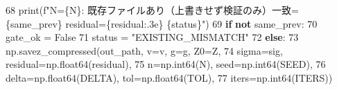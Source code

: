 \documentclass[
  a4paper,
]{ltjsarticle}
\newenvironment{Shaded}{}{}
\newcommand{\BuiltInTok}[1]{\textcolor[rgb]{0.00,0.50,0.00}{#1}}
\newcommand{\ControlFlowTok}[1]{\textcolor[rgb]{0.00,0.44,0.13}{\textbf{#1}}}
\newcommand{\DecValTok}[1]{\textcolor[rgb]{0.25,0.63,0.44}{#1}}
\newcommand{\KeywordTok}[1]{\textcolor[rgb]{0.00,0.44,0.13}{\textbf{#1}}}
\newcommand{\NormalTok}[1]{#1}
\newcommand{\OperatorTok}[1]{\textcolor[rgb]{0.40,0.40,0.40}{#1}}
\newcommand{\SpecialCharTok}[1]{\textcolor[rgb]{0.25,0.44,0.63}{#1}}
\newcommand{\SpecialStringTok}[1]{\textcolor[rgb]{0.73,0.40,0.53}{#1}}
\newcommand{\StringTok}[1]{\textcolor[rgb]{0.25,0.44,0.63}{#1}}
\newcommand{\VariableTok}[1]{\textcolor[rgb]{0.10,0.09,0.49}{#1}}
\begin{document}
\begin{Shaded}
\begin{Highlighting}[]
    \DecValTok{68}              \BuiltInTok{print}\NormalTok{(}\SpecialStringTok{f"N=}\SpecialCharTok{\{}\NormalTok{N}\SpecialCharTok{\}}\SpecialStringTok{: 既存ファイルあり（上書きせず検証のみ）一致=}\SpecialCharTok{\{}\NormalTok{same\_prev}\SpecialCharTok{\}}\SpecialStringTok{ residual=}\SpecialCharTok{\{}\NormalTok{residual}\SpecialCharTok{:.3e\}}\SpecialStringTok{ }\SpecialCharTok{\{}\NormalTok{status}\SpecialCharTok{\}}\SpecialStringTok{"}\NormalTok{)}
    \DecValTok{69}              \ControlFlowTok{if} \KeywordTok{not}\NormalTok{ same\_prev:}
    \DecValTok{70}\NormalTok{                  gate\_ok }\OperatorTok{=} \VariableTok{False}
    \DecValTok{71}\NormalTok{                  status }\OperatorTok{=} \StringTok{"EXISTING\_MISMATCH"}
    \DecValTok{72}          \ControlFlowTok{else}\NormalTok{:}
    \DecValTok{73}\NormalTok{              np.savez\_compressed(out\_path, v}\OperatorTok{=}\NormalTok{v, g}\OperatorTok{=}\NormalTok{g, Z0}\OperatorTok{=}\NormalTok{Z,}
    \DecValTok{74}\NormalTok{                                  sigma}\OperatorTok{=}\NormalTok{sig, residual}\OperatorTok{=}\NormalTok{np.float64(residual),}
    \DecValTok{75}\NormalTok{                                  n}\OperatorTok{=}\NormalTok{np.int64(N), seed}\OperatorTok{=}\NormalTok{np.int64(SEED),}
    \DecValTok{76}\NormalTok{                                  delta}\OperatorTok{=}\NormalTok{np.float64(DELTA), tol}\OperatorTok{=}\NormalTok{np.float64(TOL),}
    \DecValTok{77}\NormalTok{                                  iters}\OperatorTok{=}\NormalTok{np.int64(ITERS))}
\end{Highlighting}
\end{Shaded}
\end{document}
